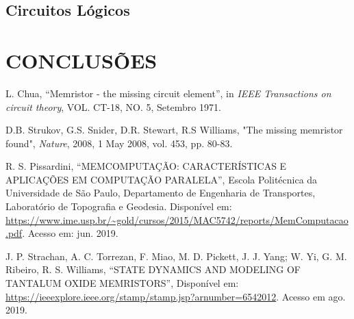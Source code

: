 \documentclass{ceel}
\begin{document}
\begin{multicols}{2}
\subsection{Circuitos Lógicos} %


\section{CONCLUSÕES}


\begin{thebibliography}{9}

    L. Chua,
    “Memristor - the missing circuit element”, 
    in \emph{IEEE Transactions on circuit theory}, VOL. CT-18, NO. 5, Setembro 1971.

     D.B. Strukov, G.S. Snider, D.R. Stewart,  R.S Williams, 
"The missing memristor found", 
\emph{Nature}, 2008, 1 May 2008, vol. 453, pp. 80-83.

    R. S. Pissardini,
    “MEMCOMPUTAÇÃO: CARACTERÍSTICAS E APLICAÇÕES EM
COMPUTAÇÃO PARALELA”, Escola Politécnica da Universidade de São Paulo, Departamento de Engenharia de Transportes, Laboratório de Topografia e Geodesia.
 Disponível em:
 \url{https://www.ime.usp.br/~gold/cursos/2015/MAC5742/reports/MemComputacao.pdf}. Acesso em: jun. 2019.
  

    J. P. Strachan, A. C. Torrezan, F. Miao, M. D. Pickett, J. J. Yang; W. Yi, G. M. Ribeiro, R. S. Williams, “STATE DYNAMICS AND MODELING OF TANTALUM OXIDE MEMRISTORS”, Disponível em: \url{https://ieeexplore.ieee.org/stamp/stamp.jsp?arnumber=6542012}. Acesso em ago. 2019.
    

\end{thebibliography}
\end{multicols}
\end{document}
